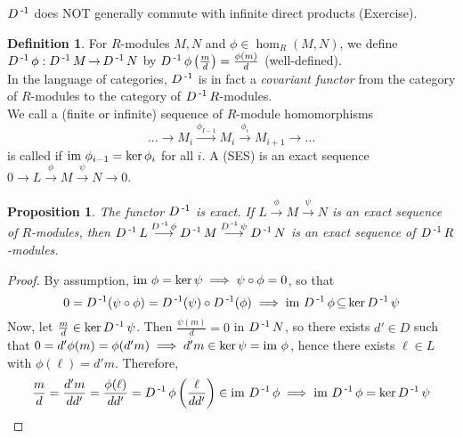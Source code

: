 \documentclass[11pt]{book}
\newcounter{counter}
\newtheorem{proposition}[counter]{Proposition}   \newtheorem{problem}[counter]{Problem}   \newtheorem*{proposition*}{Proposition}   \newtheorem*{lemma*}{Lemma}
\theoremstyle{definition}   \newtheorem{defn}[counter]{Definition} %
\newcommand{\mses}[5]{0 \longrightarrow #1 \overset{#2}{\longrightarrow} #3 \overset{#4}{\longrightarrow} #5 \longrightarrow 0}
\DeclareMathOperator{\ra}{\rightarrow}   \DeclareMathOperator{\Poly}{\mathbf{P}}   \DeclareMathOperator{\spn}{\textnormal{span}}   \DeclareMathOperator{\aut}{\textnormal{Aut}}
\newcommand{\vs}{\vspace{8pt}}
\numberwithin{counter}{chapter}
\begin{document}
\vs

\begin{remark}
$D\operatorname{^{-1}}$ does NOT generally commute with infinite direct products (Exercise). 
\end{remark}

\vs

\begin{defn}
For $R$-modules $M,N$ and $\phi \in \hom_R(M,N)$, we define $D\inv \phi : D\inv M \ra D\inv N$ by $D\operatorname{^{-1}}\phi \left(\frac{m}{d}\right) = \frac{\phi(m)}{d}$ (well-defined). \\

In the language of categories, $D\operatorname{^{-1}}$ is in fact a \emph{covariant functor} from the category of $R$-modules to the category of $D\operatorname{^{-1}} R$-modules. \\

We call a (finite or infinite) sequence of $R$-module homomorphisms
	\[...\longrightarrow M_i \overset{\phi_{I-1}}{\longrightarrow} M_i \overset{\phi_i}{\longrightarrow} M_{i+1} \longrightarrow \dots \]
is called  if $\textnormal{im } \phi_{i-1} = \ker \phi_i$ for all $i$. A  (SES) is an exact sequence \\ $\mses{L}{\phi}{M}{\psi}{N}$. 
\end{defn}

\vs

\begin{proposition}
The functor $D\operatorname{^{-1}}$ is exact. If $L \overset{\phi}{\longrightarrow} M \overset{\psi}{\longrightarrow} N$ is an exact sequence of $R$-modules, then $D\operatorname{^{-1}} L \overset{D\operatorname{^{-1}} \phi}{\longrightarrow} D\operatorname{^{-1}} M \overset{D\operatorname{^{-1}} \psi}{\longrightarrow} D\operatorname{^{-1}} N$ is an exact sequence of $D\operatorname{^{-1}} R$-modules. 
\end{proposition}

\begin{proof}
By assumption, $\textnormal{im } \phi = \ker \psi \implies \psi \circ \phi = 0$, so that
	\[0 = D\operatorname{^{-1}}(\psi \circ \phi) = D\operatorname{^{-1}}(\psi) \circ D\operatorname{^{-1}}(\phi) \implies \textnormal{im } D\operatorname{^{-1}} \phi \operatorname{\subseteq} \ker D\operatorname{^{-1}} \psi \]
Now, let $\frac{m}{d} \in \ker D\operatorname{^{-1}} \psi$. Then $\frac{\psi(m)}{d} = 0$ in $D\operatorname{^{-1}} N$, so there exists $d' \in D$ such that $0 = d'\phi(m) = \phi(d'm) \implies d'm \in \ker \psi = \textnormal{im } \phi$, hence there exists $\ell \in L$ with $\phi(\ell) = d'm$. Therefore,
	\[\frac{m}{d} = \frac{d'm}{dd'} = \frac{\phi(\ell)}{dd'} = D\operatorname{^{-1}} \phi \left(\frac{\ell}{dd'} \right) \in \textnormal{im } D\operatorname{^{-1}} \phi \implies \textnormal{im } D\operatorname{^{-1}} \phi = \ker D\operatorname{^{-1}} \psi \]
\end{proof}
\end{document}
